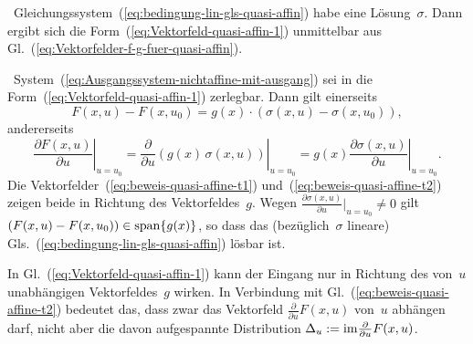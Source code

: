 \begin{svmultproof2}
\notwendig\ Gleichungssystem~(\ref{eq:bedingung-lin-gls-quasi-affin})
habe eine Lösung~$\sigma$. Dann ergibt sich die Form~(\ref{eq:Vektorfeld-quasi-affin-1})
unmittelbar aus Gl.~(\ref{eq:Vektorfelder-f-g-fuer-quasi-affin}).

\hinreichend\ System~(\ref{eq:Ausgangssystem-nichtaffine-mit-ausgang})
sei in die Form~(\ref{eq:Vektorfeld-quasi-affin-1}) zerlegbar. Dann
gilt einerseits
\begin{equation}
F(x,u)-F(x,u_{0})=g(x)\cdot\left(\sigma(x,u)-\sigma(x,u_{0})\right),\label{eq:beweis-quasi-affine-t1}
\end{equation}
andererseits 
\begin{equation}
\left.\frac{\partial F(x,u)}{\partial u}\right|_{u=u_{0}}=\left.\frac{\partial}{\partial u}\left(g(x)\,\sigma(x,u)\right)\right|_{u=u_{0}}=g(x)\left.\frac{\partial\sigma(x,u)}{\partial u}\right|_{u=u_{0}}.\label{eq:beweis-quasi-affine-t2}
\end{equation}
Die Vektorfelder~(\ref{eq:beweis-quasi-affine-t1}) und~(\ref{eq:beweis-quasi-affine-t2})
zeigen beide in Richtung des Vektorfeldes~$g$. Wegen $\tfrac{\partial\sigma(x,u)}{\partial u}|_{u=u_{0}}\neq0$
gilt $(F(x,u)-F(x,u_{0}))\in{\operatorname{span}}\{g(x)\}$, so dass das (bezüglich~$\sigma$
lineare) Gls.~(\ref{eq:bedingung-lin-gls-quasi-affin}) lösbar ist.
\end{svmultproof2}

In Gl.~(\ref{eq:Vektorfeld-quasi-affin-1}) kann der Eingang nur
in Richtung des von~$u$ unabhängigen Vektorfeldes~$g$ wirken.
In Verbindung mit Gl.~(\ref{eq:beweis-quasi-affine-t2}) bedeutet
das, dass zwar das Vektorfeld $\tfrac{\partial}{\partial u}F(x,u)$
von~$u$ abhängen darf, nicht aber die davon aufgespannte Distribution
$\Delta_{u}:={\operatorname{im}}\tfrac{\partial}{\partial u}F(x,u)$.

